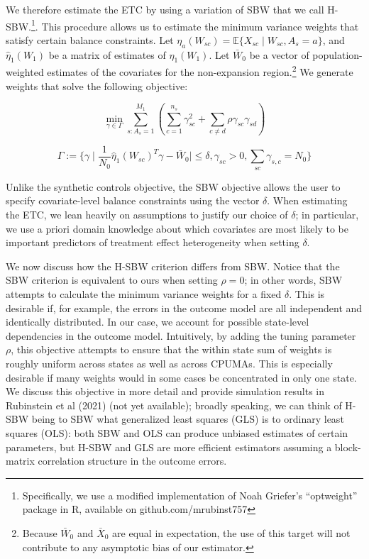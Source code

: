 \documentclass[12pt]{article}
\begin{document}
We therefore estimate the ETC by using a variation of SBW that we call H-SBW.\footnote{Specifically, we use a modified implementation of Noah Griefer's ``optweight'' package in R, available on github.com/mrubinst757}. This procedure allows us to estimate the minimum variance weights that satisfy certain balance constraints. Let $\eta_a(W_{sc}) = \mathbb{E}\{X_{sc} \mid W_{sc}, A_s = a\}$, and $\hat{\eta}_1(W_1)$ be a matrix of estimates of $\eta_1(W_1)$. Let $\bar{W}_0$ be a vector of population-weighted estimates of the covariates for the non-expansion region.\footnote{Because $\bar{W}_0$ and $\bar{X}_0$ are equal in expectation, the use of this target will not contribute to any asymptotic bias of our estimator.} We generate weights that solve the following objective:

$$
\min_{\gamma \in \Gamma} \sum_{s: A_s = 1}^{M_1}(\sum_{c = 1}^{n_s} \gamma_{sc}^2 + \sum_{c \ne d}\rho \gamma_{sc}\gamma_{sd})
$$

$$
\Gamma := \{\gamma \mid \frac{1}{N_0}\hat{\eta}_1(W_{sc})^T\gamma - \bar{W}_0 \mid \le \delta, \gamma_{sc} > 0, \sum_{sc}\gamma_{s,c} = N_0\}
$$

Unlike the synthetic controls objective, the SBW objective allows the user to specify covariate-level balance constraints using the vector $\delta$. When estimating the ETC, we lean heavily on assumptions to justify our choice of $\delta$; in particular, we use a priori domain knowledge about which covariates are most likely to be important predictors of treatment effect heterogeneity when setting $\delta$. 

We now discuss how the H-SBW criterion differs from SBW. Notice that the SBW criterion is equivalent to ours when setting $\rho = 0$; in other words, SBW attempts to calculate the minimum variance weights for a fixed $\delta$. This is desirable if, for example, the errors in the outcome model are all independent and identically distributed. In our case, we account for possible state-level dependencies in the outcome model. Intuitively, by adding the tuning parameter $\rho$, this objective attempts to ensure that the within state sum of weights is roughly uniform across states as well as across CPUMAs. This is especially desirable if many weights would in some cases be concentrated in only one state. We discuss this objective in more detail and provide simulation results in Rubinstein et al (2021) (not yet available); broadly speaking, we can think of H-SBW being to SBW what generalized least squares (GLS) is to ordinary least squares (OLS): both SBW and OLS can produce unbiased estimates of certain parameters, but H-SBW and GLS are more efficient estimators assuming a block-matrix correlation structure in the outcome errors.
\end{document}
